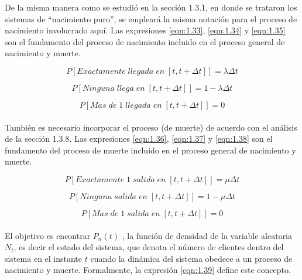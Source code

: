 De la misma manera como se estudió en la sección 1.3.1, en donde se trataron los sistemas de “nacimiento puro”, se empleará la misma notación para el proceso de nacimiento involucrado aquí. Las expresiones \ref{eqn:1.33}, \ref{eqn:1.34} y \ref{eqn:1.35} son el fundamento del proceso de nacimiento incluido en el proceso general de nacimiento y muerte.


\begin{equation}
   P \left [ Exactamente\; llegada\; en\;\left [ t,t+\Delta t \right ] \right ]=\lambda \Delta t
   \label{eqn:1.33}
\end{equation}



\begin{equation}
    P \left [ Ninguna\; llega\; en\;\left [ t,t+\Delta t \right ] \right ]=1-\lambda \Delta t
    \label{eqn:1.34}
\end{equation}



\begin{equation}
    P \left [ Mas\; de\; 1\; llegada\; en\; \left [ t,t+\Delta t \right ] \right ]=0
    \label{eqn:1.35}
\end{equation}
\\
También es necesario incorporar el proceso (de muerte) de acuerdo con el análisis de la sección 1.3.8. Las expresiones \ref{eqn:1.36}, \ref{eqn:1.37} y \ref{eqn:1.38} son el fundamento del proceso de muerte
incluido en el proceso general de nacimiento y muerte. 

\begin{equation}
   P \left [ Exactamente\; 1\; salida\; en\; \left [ t,t+\Delta t \right ] \right ]=\mu \Delta t
   \label{eqn:1.36}
\end{equation}

\begin{equation}
   P \left [ Ninguna\;  salida\; en\; \left [ t,t+\Delta t \right ] \right ]=1-\mu \Delta t
   \label{eqn:1.37}
\end{equation}

\begin{equation}
   P \left [ Mas\;  de\; 1\; salida\; en\; \left [ t,t+\Delta t \right ] \right ]=0
   \label{eqn:1.38}
\end{equation}
\\
El objetivo es encontrar $P_{n}\left ( t \right )$ , la función de densidad de la variable aleatoria $N_{t}$, es decir el estado del sistema, que denota el número de clientes dentro del sistema en el instante $t$ cuando la dinámica del sistema obedece a un proceso de nacimiento y muerte. Formalmente, la expresión \ref{eqn:1.39} define este concepto.

